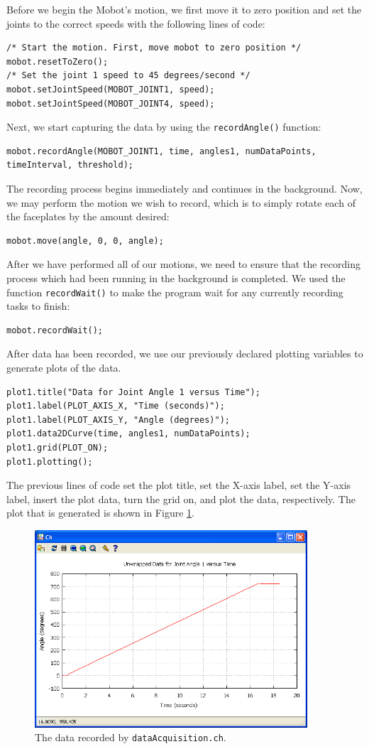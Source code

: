 \documentclass{article}
\begin{document}
Before we begin the Mobot's motion, we first move it to zero position and set the
joints to the correct speeds with the following lines of code:
\begin{verbatim}
/* Start the motion. First, move mobot to zero position */
mobot.resetToZero();
/* Set the joint 1 speed to 45 degrees/second */
mobot.setJointSpeed(MOBOT_JOINT1, speed);
mobot.setJointSpeed(MOBOT_JOINT4, speed);
\end{verbatim}

Next, we start capturing the data by using the \texttt{recordAngle()} function:
\begin{verbatim}
mobot.recordAngle(MOBOT_JOINT1, time, angles1, numDataPoints, timeInterval, threshold);
\end{verbatim}

The recording process begins immediately and continues in the background. Now,
we may perform the motion we wish to record, which is to simply rotate each of
the faceplates by the amount desired:
\begin{verbatim}
mobot.move(angle, 0, 0, angle);
\end{verbatim}

After we have performed all of our motions, we need to ensure that the recording
process which had been running in the background is completed. We used the function
\texttt{recordWait()} to make the program wait for any currently recording tasks
to finish:
\begin{verbatim}
mobot.recordWait();
\end{verbatim}

After data has been recorded, we use our previously declared plotting variables to 
generate plots of the data. 
\begin{verbatim}
plot1.title("Data for Joint Angle 1 versus Time");
plot1.label(PLOT_AXIS_X, "Time (seconds)");
plot1.label(PLOT_AXIS_Y, "Angle (degrees)");
plot1.data2DCurve(time, angles1, numDataPoints);
plot1.grid(PLOT_ON);
plot1.plotting();
\end{verbatim}
The previous lines of code set the plot title, set the X-axis label, set the Y-axis label,
insert the plot data, turn the grid on, and plot the data, respectively. The plot
that is generated is shown in Figure \ref{fig:dataacq1_fig2}. 

\begin{figure}[H]
\centering
\includegraphics[width=4in]{images/dataacq1_plot2.png}
\caption{\label{fig:dataacq1_fig2} The data recorded by \texttt{dataAcquisition.ch}.}
\end{figure}
\end{document}
